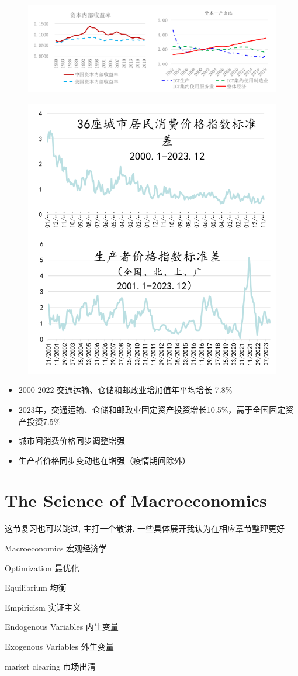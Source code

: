 \documentclass[lang=cn,10pt,green]{elegantbook}
\begin{document}
\begin{figure}[htbp]
    \centering
    \includegraphics[width=0.75\linewidth]{image/科技赋能助力经济增长.png}
\end{figure}
\begin{figure}[htbp]
    \centering
    \includegraphics[width=0.4\linewidth]{image/统一市场.png}
\end{figure}

\begin{itemize}
    \item 2000-2022 交通运输、仓储和邮政业增加值年平均增长 7.8\%
    \item 2023年，交通运输、仓储和邮政业固定资产投资增长10.5\%，高于全国固定资产投资7.5\%
    \item 城市间消费价格同步调整增强
    \item 生产者价格同步变动也在增强（疫情期间除外）
\end{itemize}


\chapter{The Science of Macroeconomics}

这节复习也可以跳过, 主打一个散讲. 一些具体展开我认为在相应章节整理更好

\begin{introduction}[Keywords]
\item Macroeconomics 宏观经济学
\item Optimization 最优化
\item Equilibrium 均衡
\item Empiricism 实证主义
\item Endogenous Variables 内生变量
\item Exogenous Variables 外生变量
\item market clearing 市场出清
\end{introduction}
\end{document}
